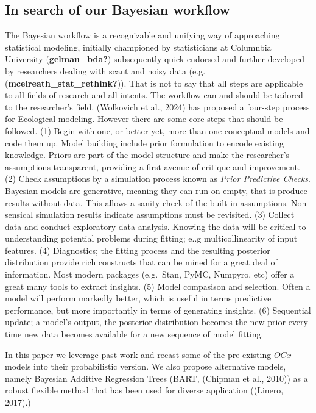 \documentclass[
]{agujournal2019}
\begin{document}
\subsection{In search of our Bayesian
workflow}\label{in-search-of-our-bayesian-workflow}

The Bayesian workflow is a recognizable and unifying way of approaching
statistical modeling, initially championed by statisticians at Columnbia
University (\textbf{gelman\_bda?}) subsequently quick endorsed and
further developed by researchers dealing with scant and noisy data (e.g.
(\textbf{mcelreath\_stat\_rethink?})). That is not to say that all steps
are applicable to all fields of research and all intents. The workflow
can and should be tailored to the researcher's field. (Wolkovich et al.,
2024) has proposed a four-step process for Ecological modeling. However
there are some core steps that should be followed. (1) Begin with one,
or better yet, more than one conceptual models and code them up. Model
building include prior formulation to encode existing knowledge. Priors
are part of the model structure and make the researcher's assumptions
transparent, providing a first avenue of critique and improvement. (2)
Check assumptions by a simulation process known as \emph{Prior
Predictive Checks}. Bayesian models are generative, meaning they can run
on empty, that is produce results without data. This allows a sanity
check of the built-in assumptions. Non-sensical simulation results
indicate assumptions must be revisited. (3) Collect data and conduct
exploratory data analysis. Knowing the data will be critical to
understanding potential problems during fitting; e..g multicollinearity
of input features. (4) Diagnostics; the fitting process and the
resulting posterior distribution provide rich constructs that can be
mined for a great deal of information. Most modern packages (e.g.~Stan,
PyMC, Numpyro, etc) offer a great many tools to extract insights. (5)
Model compasison and selection. Often a model will perform markedly
better, which is useful in terms predictive performance, but more
importantly in terms of generating insights. (6) Sequential update; a
model's output, the posterior distribution becomes the new prior every
time new data becomes available for a new sequence of model fitting.

In this paper we leverage past work and recast some of the pre-existing
\(OCx\) models into their probabilistic version. We also propose
alternative models, namely Bayesian Additive Regression Trees (BART,
(Chipman et al., 2010)) as a robust flexible method that has been used
for diverse application ((Linero, 2017).)
\end{document}
